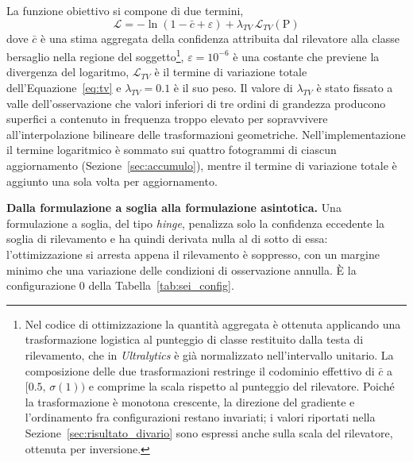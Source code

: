 \ifstampa\documentclass[a4paper,12pt,twoside,openright]{report}\else\documentclass[a4paper,12pt]{report}\fi
\newif\ifrevisione \revisionefalse
\DeclareRobustCommand{\rev}[1]{\ifrevisione{\color{blue!65!black}#1}\else#1\fi}
\begin{document}
La funzione obiettivo si compone di due termini,
\begin{equation}
    \mathcal{L} = -\ln\left(1 - \bar{c} + \varepsilon\right)
    + \lambda_{TV} \, \mathcal{L}_{TV}(\mathrm{P})
    \label{eq:loss_totale}
\end{equation}
dove $\bar{c}$ è una stima aggregata della confidenza attribuita dal
rilevatore alla classe bersaglio nella regione del soggetto\footnote{Nel codice
di ottimizzazione la quantità aggregata è ottenuta applicando una
trasformazione logistica al punteggio di classe restituito dalla testa di
rilevamento, che in \textit{Ultralytics} è già normalizzato nell'intervallo
unitario. La composizione delle due trasformazioni restringe il codominio
effettivo di $\bar{c}$ a $[0.5,\,\sigma(1))$ e comprime la scala rispetto al
punteggio del rilevatore. Poiché la trasformazione è monotona crescente, la
direzione del gradiente e l'ordinamento fra configurazioni restano invariati; i
valori riportati nella Sezione~\ref{sec:risultato_divario} sono espressi anche
sulla scala del rilevatore, ottenuta per inversione.}, $\varepsilon =
10^{-6}$ è una costante che previene la divergenza del logaritmo,
$\mathcal{L}_{TV}$ è il termine di variazione totale dell'Equazione~\ref{eq:tv}
e $\lambda_{TV} = 0.1$ è il suo peso. Il valore di $\lambda_{TV}$ è stato
fissato a valle dell'osservazione che valori inferiori di tre ordini di
grandezza producono superfici a contenuto in frequenza troppo elevato per
sopravvivere all'interpolazione bilineare delle trasformazioni geometriche.
\rev{Nell'implementazione il termine logaritmico è sommato sui quattro
fotogrammi di ciascun aggiornamento (Sezione~\ref{sec:accumulo}), mentre il
termine di variazione totale è aggiunto una sola volta per aggiornamento.}

\textbf{Dalla formulazione a soglia alla formulazione asintotica.}
\label{sec:loss_asintotica}
\rev{Una formulazione a soglia, del tipo \textit{hinge}, penalizza solo la
confidenza eccedente la soglia di rilevamento e ha quindi derivata nulla al di
sotto di essa: l'ottimizzazione si arresta appena il rilevamento è soppresso,
con un margine minimo che una variazione delle condizioni di osservazione
annulla. È la configurazione 0 della Tabella~\ref{tab:sei_config}.}
\end{document}
